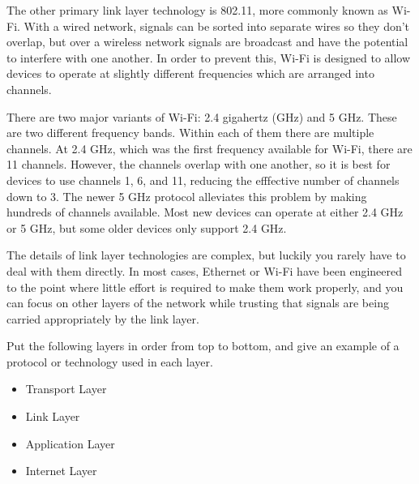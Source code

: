 The other primary link layer technology is 802.11, more commonly known as Wi-Fi. With a wired network, signals can be sorted into separate wires so they don't overlap, but over a wireless network signals are broadcast and have the potential to interfere with one another. In order to prevent this, Wi-Fi is designed to allow devices to operate at slightly different frequencies which are arranged into channels.

There are two major variants of Wi-Fi: 2.4 gigahertz (GHz) and 5 GHz. These are two different frequency bands. Within each of them there are multiple channels. At 2.4 GHz, which was the first frequency available for Wi-Fi, there are 11 channels. However, the channels overlap with one another, so it is best for devices to use channels 1, 6, and 11, reducing the efffective number of channels down to 3. The newer 5 GHz protocol alleviates this problem by making hundreds of channels available. Most new devices can operate at either 2.4 GHz or 5 GHz, but some older devices only support 2.4 GHz.

The details of link layer technologies are complex, but luckily you rarely have to deal with them directly. In most cases, Ethernet or Wi-Fi have been engineered to the point where little effort is required to make them work properly, and you can focus on other layers of the network while trusting that signals are being carried appropriately by the link layer.

\exercisesection

\begin{exercise}
    Put the following layers in order from top to bottom, and give an example of a protocol or technology used in each layer.
    \begin{itemize}
        \item Transport Layer
        \item Link Layer
        \item Application Layer
        \item Internet Layer
    \end{itemize}
\end{exercise}



